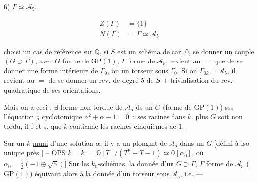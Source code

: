 6) $\Gamma\simeq\mathcal A_5$.

\[
\begin{aligned}
Z(\Gamma)&=\{1\}\\ 
N(\Gamma)&=\Gamma\simeq\mathcal A_5
\end{aligned}
\]

 choisi un cas de référence  sur $\mathbb Q$, si $S$ est
un schéma de car. 0, se donner un couple
$(G\supset\Gamma)$, avec $G$ forme de $\mathrm{GP}(1)$, $\Gamma$ forme de $\mathcal A_5$,
revient au $=$ que de se donner une forme
\uline{intérieure} de $\Gamma_0$, ou un torseur sous $\Gamma_0$.
Si on   $\Gamma_{0k}=\mathcal A_5$, il revient au $=$ de se donner
 un rev. de degré 5 de $S$ + trivialisation
du rev. quadratique de ses orientations.

Mais on a ceci : $\exists$  forme non tordue de $\mathcal A_5$ ds un
$G$ (forme de $\mathrm{GP}(1)$) sss l'équation $\frac12$ cyclotomique
$\alpha^2+\alpha-1=0$ a ses racines dans $k$. 
  plus $G$ soit non tordu, il f et s. que
$k$ contienne les racines cinquièmes de $1$.


Sur un $k$ \uline{muni} d'une solution $\alpha$, il y a un
plongmt de $\mathcal A_5$ dans un $G$ [défini à iso unique
près ]
-- OPS $k=k_0=\mathbb Q[T]/(T^2+T-1)\simeq\mathbb Q[\alpha_0]$, où
$\alpha_0=\frac12(-1\mathbin{\oplus}\sqrt5)$] Sur les $k_0$-schémas, la donnée
d'un $G\supset\Gamma$, $\Gamma$  forme de $\mathcal A_5$ ($\mathrm{GP}(1)$) équivaut
alors à la donnée d'un torseur sous $\mathcal A_5$,
i.e. ---

